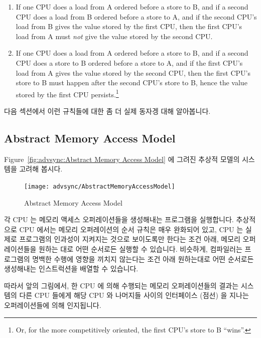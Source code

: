 \begin{enumerate}
\item	If one CPU does a load from A ordered before a store to B,
	and if a second CPU does a load from B ordered before a store to A,
	and if the second CPU's load from B gives the value stored by
	the first CPU, then the first CPU's load from A must \emph{not}
	give the value stored by the second CPU.
\item	If one CPU does a load from A ordered before a store to B,
	and if a second CPU does a store to B ordered before a
	store to A, and if the first CPU's load from A gives
	the value stored by the second CPU, then the first CPU's
	store to B must happen after the second CPU's store to B,
	hence the value stored by the first CPU persists.\footnote{
		Or, for the more competitively oriented, the first
		CPU's store to B ``wins''.}
\fi
\end{enumerate}

다음 섹션에서 이런 규칙들에 대한 좀 더 실제 동자겡 대해 알아봅니다.

\subsection{Abstract Memory Access Model}

Figure~\ref{fig:advsync:Abstract Memory Access Model} 에 그려진 추상적 모델의
시스템을 고려해 봅시다.

\begin{figure}[htb]
\centering
\texttt{[image: advsync/AbstractMemoryAccessModel]}
\caption{Abstract Memory Access Model}
\end{figure}

각 CPU 는 메모리 액세스 오퍼레이션들을 생성해내는 프로그램을 실행합니다.
추상적으로 CPU 에서는 메모리 오퍼레이션의 순서 규칙은 매우 완화되어 있고, CPU
는 실제로 프로그램의 인과성이 지켜지는 것으로 보이도록만 한다는 조건 아래,
메모리 오퍼레이션들을 원하는 대로 어떤 순서로든 실행할 수 있습니다.
비슷하게, 컴파일러는 프로그램의 명백한 수행에 영향을 끼치지 않는다는 조건 아래
원하는대로 어떤 순서로든 생성해내는 인스트럭션을 배열할 수 있습니다.

따라서 앞의 그림에서, 한 CPU 에 의해 수행되는 메모리 오퍼레이션들의 결과는
시스템의 다른 CPU 들에게 해당 CPU 와 나머지들 사이의 인터페이스 (점선) 을
지나는 오퍼레이션들에 의해 인지됩니다.


